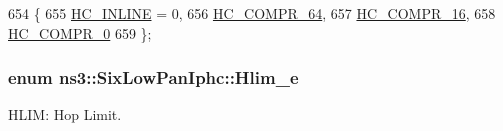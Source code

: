 \begin{DoxyCode}
654   \{
655     \hyperlink{classns3_1_1SixLowPanIphc_a384e6b68c86e9d9a07c923dbc21a6843a67481ea7303a3a3bcdd03f14630a1e42}{HC\_INLINE} = 0,
656     \hyperlink{classns3_1_1SixLowPanIphc_a384e6b68c86e9d9a07c923dbc21a6843a79b29ccd0370a00b3e182abee52ea59a}{HC\_COMPR\_64},
657     \hyperlink{classns3_1_1SixLowPanIphc_a384e6b68c86e9d9a07c923dbc21a6843a492caa9d3c810686e9e3f1c35ef39fd9}{HC\_COMPR\_16},
658     \hyperlink{classns3_1_1SixLowPanIphc_a384e6b68c86e9d9a07c923dbc21a6843a20c6daaf8cc1cfec17270484cec677c0}{HC\_COMPR\_0}
659   \};
\end{DoxyCode}
\subsubsection[{\texorpdfstring{Hlim\+\_\+e}{Hlim_e}}]{\setlength{\rightskip}{0pt plus 5cm}enum {\bf ns3\+::\+Six\+Low\+Pan\+Iphc\+::\+Hlim\+\_\+e}}\hypertarget{classns3_1_1SixLowPanIphc_a1fa5a18c5d53fd3583960b4ba01f093d}{}\label{classns3_1_1SixLowPanIphc_a1fa5a18c5d53fd3583960b4ba01f093d}


H\+L\+IM\+: Hop Limit. 

